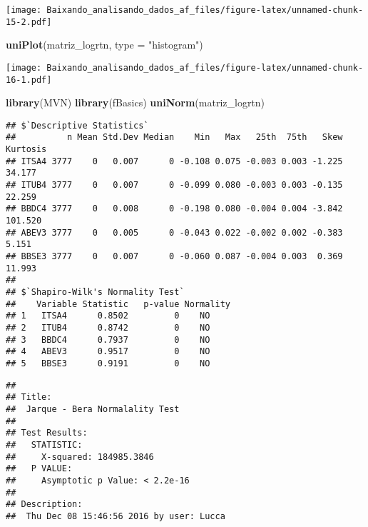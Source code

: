 \documentclass[]{article}
\newenvironment{Shaded}{\begin{snugshade}}{\end{snugshade}}
\newcommand{\KeywordTok}[1]{\textcolor[rgb]{0.13,0.29,0.53}{\textbf{{#1}}}}
\newcommand{\DataTypeTok}[1]{\textcolor[rgb]{0.13,0.29,0.53}{{#1}}}
\newcommand{\StringTok}[1]{\textcolor[rgb]{0.31,0.60,0.02}{{#1}}}
\newcommand{\NormalTok}[1]{{#1}}
\begin{document}
\texttt{[image: Baixando\_analisando\_dados\_af\_files/figure-latex/unnamed-chunk-15-2.pdf]}

\begin{Shaded}
\begin{Highlighting}[]
\KeywordTok{uniPlot}\NormalTok{(matriz_logrtn, }\DataTypeTok{type =} \StringTok{"histogram"}\NormalTok{)}
\end{Highlighting}
\end{Shaded}

\texttt{[image: Baixando\_analisando\_dados\_af\_files/figure-latex/unnamed-chunk-16-1.pdf]}

\begin{Shaded}
\begin{Highlighting}[]
\KeywordTok{library}\NormalTok{(MVN)}
\KeywordTok{library}\NormalTok{(fBasics)}
\KeywordTok{uniNorm}\NormalTok{(matriz_logrtn)}
\end{Highlighting}
\end{Shaded}

\begin{verbatim}
## $`Descriptive Statistics`
##          n Mean Std.Dev Median    Min   Max   25th  75th   Skew Kurtosis
## ITSA4 3777    0   0.007      0 -0.108 0.075 -0.003 0.003 -1.225   34.177
## ITUB4 3777    0   0.007      0 -0.099 0.080 -0.003 0.003 -0.135   22.259
## BBDC4 3777    0   0.008      0 -0.198 0.080 -0.004 0.004 -3.842  101.520
## ABEV3 3777    0   0.005      0 -0.043 0.022 -0.002 0.002 -0.383    5.151
## BBSE3 3777    0   0.007      0 -0.060 0.087 -0.004 0.003  0.369   11.993
## 
## $`Shapiro-Wilk's Normality Test`
##    Variable Statistic   p-value Normality
## 1   ITSA4      0.8502         0    NO    
## 2   ITUB4      0.8742         0    NO    
## 3   BBDC4      0.7937         0    NO    
## 4   ABEV3      0.9517         0    NO    
## 5   BBSE3      0.9191         0    NO
\end{verbatim}

\begin{Shaded}
\end{Shaded}

\begin{verbatim}
## 
## Title:
##  Jarque - Bera Normalality Test
## 
## Test Results:
##   STATISTIC:
##     X-squared: 184985.3846
##   P VALUE:
##     Asymptotic p Value: < 2.2e-16 
## 
## Description:
##  Thu Dec 08 15:46:56 2016 by user: Lucca
\end{verbatim}
\end{document}
